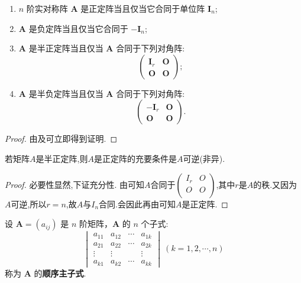 \documentclass[../../main.tex]{subfiles}
\begin{document}
\begin{theorem}[(半)正定/负定阵的合同标准型]\label{theorem:正定矩阵的充要条件}
\begin{enumerate}[(1)]
\item $n$ 阶实对称阵 $\boldsymbol{A}$ 是正定阵当且仅当它合同于单位阵 $\boldsymbol{I}_n$;

\item $\boldsymbol{A}$ 是负定阵当且仅当它合同于 $-\boldsymbol{I}_n$;

\item $\boldsymbol{A}$ 是半正定阵当且仅当 $\boldsymbol{A}$ 合同于下列对角阵:
\[
\begin{pmatrix}
\boldsymbol{I}_r & \boldsymbol{O}\\
\boldsymbol{O} & \boldsymbol{O}
\end{pmatrix};
\]

\item $\boldsymbol{A}$ 是半负定阵当且仅当 $\boldsymbol{A}$ 合同于下列对角阵:
\[
\begin{pmatrix}
-\boldsymbol{I}_r & \boldsymbol{O}\\
\boldsymbol{O} & \boldsymbol{O}
\end{pmatrix}.
\] 
\end{enumerate}
\end{theorem}
\begin{proof}
由及可立即得到证明.

\end{proof}

\begin{corollary}\label{corollary:可逆的半正定阵必是正定阵}
若矩阵$A$是半正定阵,则$A$是正定阵的充要条件是$A$可逆(非异).
\end{corollary}
\begin{proof}
必要性显然,下证充分性.
由可知$A$合同于$\left( \begin{matrix}
I_r&		O\\
O&		O\\
\end{matrix} \right) $,其中$r$是$A$的秩.又因为$A$可逆,所以$r=n$,故$A$与$I_n$合同.会因此再由可知$A$是正定阵.

\end{proof}

\begin{definition}[顺序主子式]
设 $\boldsymbol{A}=(a_{ij})$ 是 $n$ 阶矩阵，$\boldsymbol{A}$ 的 $n$ 个子式:
\[
\begin{vmatrix}
a_{11} & a_{12} & \cdots & a_{1k}\\
a_{21} & a_{22} & \cdots & a_{2k}\\
\vdots & \vdots & & \vdots\\
a_{k1} & a_{k2} & \cdots & a_{kk}
\end{vmatrix}\ (k = 1,2,\cdots,n)
\]
称为 $\boldsymbol{A}$ 的\textbf{顺序主子式}.
\end{definition}
\end{document}
